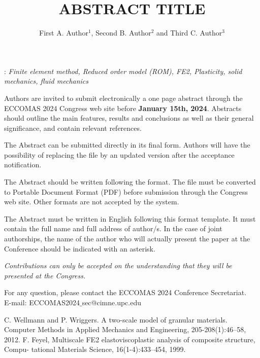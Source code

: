 \documentclass[12pt]{eccomas-2024}
\title{ABSTRACT TITLE}
\author{First A. Author$^{1}$, Second B. Author$^{2}$ and Third C. Author$^{3}$}
\begin{document}
: {\it Finite element method, Reduced order model (ROM), FE2, Plasticity, solid mechanics, fluid mechanics}
\vskip0.5cm

Authors are invited to submit electronically a one page abstract through the ECCOMAS 2024 Congress web site before \textbf{January 15th, 2024}. Abstracts should outline the main features, results and conclusions as well as their general significance, and contain relevant references.

The Abstract can be submitted directly in its final form. Authors will have the possibility of replacing the file by an updated version after the acceptance notification.

The Abstract should be written following the format. The file must be converted to Portable Document Format (PDF) before submission through the Congress web site. Other formats are not accepted by the system.

The Abstract must be written in English following this format template. It must contain the full name and full address of author/s. In the case of joint authorships, the name of the author who will actually present the paper at the Conference should be indicated with an asterisk.

\emph{Contributions can only be accepted on the understanding that they will be presented at the Congress.}

For any question, please contact the ECCOMAS 2024 Conference Secretariat.\\
E-mail: ECCOMAS2024$\_$sec@cimne.upc.edu


\begin{thebibliography}{99}
  C. Wellmann and P. Wriggers.  A two-scale model of granular materials. Computer Methods in Applied Mechanics and Engineering, 205-208(1):46–58, 2012.
 F. Feyel, Multiscale FE2 elastoviscoplastic analysis of composite structure, Compu-
tational Materials Science, 16(1-4):433–454, 1999.
\end{thebibliography}
\end{document}
